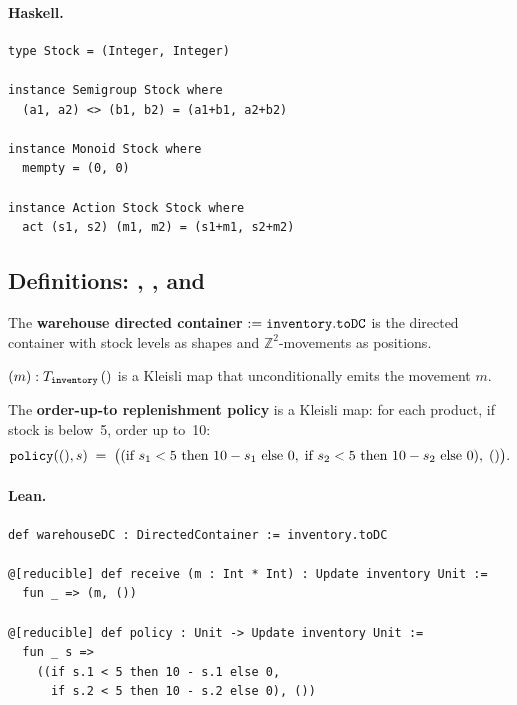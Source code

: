 \documentclass[11pt,a4paper]{article}
\begin{document}
\paragraph{Haskell.}
\begin{lstlisting}[style=haskell]
type Stock = (Integer, Integer)

instance Semigroup Stock where
  (a1, a2) <> (b1, b2) = (a1+b1, a2+b2)

instance Monoid Stock where
  mempty = (0, 0)

instance Action Stock Stock where
  act (s1, s2) (m1, m2) = (s1+m1, s2+m2)
\end{lstlisting}


\subsection{Definitions: , , and }

\begin{defn}
The \textbf{warehouse directed container}  $:=
\texttt{inventory}.\texttt{toDC}$ is the directed container with stock levels as
shapes and $\mathbb{Z}^2$-movements as positions.

$(m) : T_{\texttt{inventory}}\, ()$ is a Kleisli map that
unconditionally emits the movement $m$.

The \textbf{order-up-to replenishment policy} is a Kleisli map: for each
product, if stock is below~5, order up to~10:
\[
  \texttt{policy}((), s) \;=\; \bigl((\text{if } s_1 < 5 \text{ then } 10 - s_1
  \text{ else } 0,\; \text{if } s_2 < 5 \text{ then } 10 - s_2 \text{ else } 0),\;
  ()\bigr).
\]
\end{defn}

\paragraph{Lean.}
\begin{lstlisting}[style=lean]
def warehouseDC : DirectedContainer := inventory.toDC

@[reducible] def receive (m : Int * Int) : Update inventory Unit :=
  fun _ => (m, ())

@[reducible] def policy : Unit -> Update inventory Unit :=
  fun _ s =>
    ((if s.1 < 5 then 10 - s.1 else 0,
      if s.2 < 5 then 10 - s.2 else 0), ())
\end{lstlisting}
\end{document}
